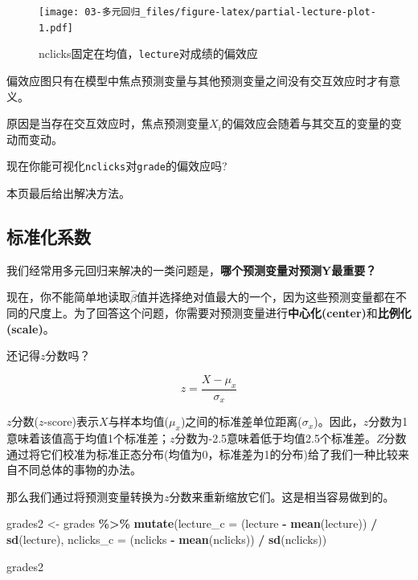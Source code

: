 \documentclass[
]{book}
\newenvironment{Shaded}{\begin{snugshade}}{\end{snugshade}}
\newcommand{\AttributeTok}[1]{\textcolor[rgb]{0.13,0.29,0.53}{#1}}
\newcommand{\FunctionTok}[1]{\textcolor[rgb]{0.13,0.29,0.53}{\textbf{#1}}}
\newcommand{\NormalTok}[1]{#1}
\newcommand{\OtherTok}[1]{\textcolor[rgb]{0.56,0.35,0.01}{#1}}
\newcommand{\SpecialCharTok}[1]{\textcolor[rgb]{0.81,0.36,0.00}{\textbf{#1}}}
\begin{document}
\begin{figure}
\centering
\texttt{[image: 03-多元回归\_files/figure-latex/partial-lecture-plot-1.pdf]}
\caption{\label{fig:partial-lecture-plot}nclicks固定在均值，\texttt{lecture}对成绩的偏效应}
\end{figure}

偏效应图只有在模型中焦点预测变量与其他预测变量之间没有交互效应时才有意义。

原因是当存在交互效应时，焦点预测变量\(X_i\)的偏效应会随着与其交互的变量的变动而变动。

现在你能可视化\texttt{nclicks}对\texttt{grade}的偏效应吗?

本页最后给出解决方法。

\hypertarget{ux6807ux51c6ux5316ux7cfbux6570}{%
\subsection{标准化系数}\label{ux6807ux51c6ux5316ux7cfbux6570}}

我们经常用多元回归来解决的一类问题是，\textbf{哪个预测变量对预测Y最重要？}

现在，你不能简单地读取\(\hat{\beta}\)值并选择绝对值最大的一个，因为这些预测变量都在不同的尺度上。为了回答这个问题，你需要对预测变量进行\textbf{中心化(center)}和\textbf{比例化(scale)}。

还记得\(z\)分数吗？

\[
z = \frac{X - \mu_x}{\sigma_x}
\]

\(z\)分数(\(z\)-score)表示\(X\)与样本均值(\(\mu_x\))之间的标准差单位距离(\(\sigma_x\))。因此，\(z\)分数为1意味着该值高于均值1个标准差；\(z\)分数为-2.5意味着低于均值2.5个标准差。\(Z\)分数通过将它们校准为标准正态分布(均值为0，标准差为1的分布)给了我们一种比较来自不同总体的事物的办法。

那么我们通过将预测变量转换为\(z\)分数来重新缩放它们。这是相当容易做到的。

\begin{Shaded}
\begin{Highlighting}[]
\NormalTok{grades2 }\OtherTok{\textless{}{-}}\NormalTok{ grades }\SpecialCharTok{\%\textgreater{}\%}
  \FunctionTok{mutate}\NormalTok{(}\AttributeTok{lecture\_c =}\NormalTok{ (lecture }\SpecialCharTok{{-}} \FunctionTok{mean}\NormalTok{(lecture)) }\SpecialCharTok{/} \FunctionTok{sd}\NormalTok{(lecture),}
         \AttributeTok{nclicks\_c =}\NormalTok{ (nclicks }\SpecialCharTok{{-}} \FunctionTok{mean}\NormalTok{(nclicks)) }\SpecialCharTok{/} \FunctionTok{sd}\NormalTok{(nclicks))}

\NormalTok{grades2}
\end{Highlighting}
\end{Shaded}
\end{document}
